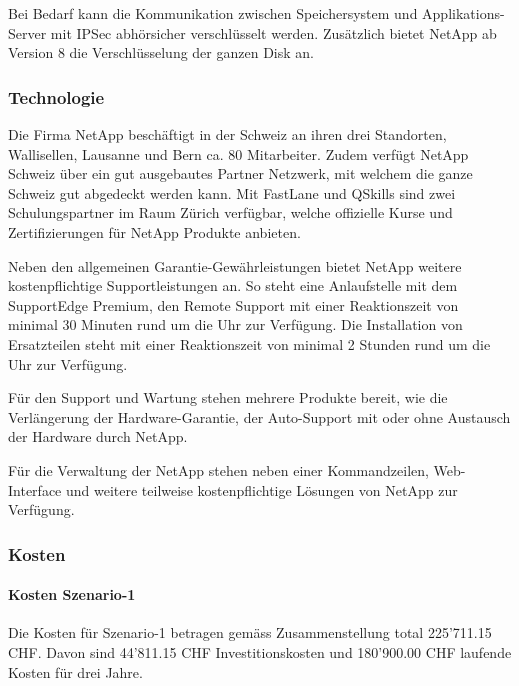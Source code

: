 Bei Bedarf kann die Kommunikation zwischen Speichersystem und Applikations-Server mit IPSec abhörsicher verschlüsselt werden. Zusätzlich bietet NetApp ab Version 8 die Verschlüsselung der ganzen Disk an.

\subsubsection*{Technologie}
Die Firma NetApp beschäftigt in der Schweiz an ihren drei Standorten, Wallisellen, Lausanne und Bern ca. 80 Mitarbeiter. Zudem verfügt NetApp Schweiz über ein gut ausgebautes Partner Netzwerk, mit welchem die ganze Schweiz gut abgedeckt werden kann. Mit FastLane und QSkills sind zwei Schulungspartner im Raum Zürich verfügbar, welche offizielle Kurse und Zertifizierungen für NetApp Produkte anbieten. 

Neben den allgemeinen Garantie-Gewährleistungen bietet NetApp weitere kostenpflichtige Supportleistungen an. So steht eine Anlaufstelle mit dem SupportEdge Premium, den Remote Support mit einer Reaktionszeit von minimal 30 Minuten rund um die Uhr zur Verfügung. Die Installation von Ersatzteilen steht mit einer Reaktionszeit von minimal 2 Stunden rund um die Uhr zur Verfügung. 

Für den Support und Wartung stehen mehrere Produkte bereit, wie die Verlängerung der Hardware-Garantie, der Auto-Support mit oder ohne Austausch der Hardware durch NetApp.

Für die Verwaltung der NetApp stehen neben einer Kommandzeilen, Web-Interface und weitere teilweise kostenpflichtige Lösungen von NetApp zur Verfügung. 

\subsubsection*{Kosten}

\paragraph*{Kosten Szenario-1}
Die Kosten für Szenario-1 betragen gemäss Zusammenstellung total 225'711.15 CHF. Davon sind 44'811.15 CHF Investitionskosten und 180'900.00 CHF laufende Kosten für drei Jahre.

